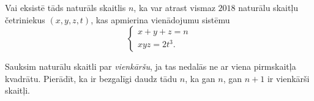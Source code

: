 \documentclass[11pt]{article}
\begin{document}
\begin{problem}[BwTst2018.15]
Vai eksistē tāds naturāls skaitlis $n$, ka var atrast vismaz $2018$ naturālu skaitļu četriniekus $(x,y,z,t)$, 
kas apmierina vienādojumu sistēmu
\[ \left\{ \begin{array}{l}
x + y + z = n\\
xyz = 2t^3. 
\end{array} \right. \]
\end{problem}

\begin{problem}[BwTst2018.16]
Sauksim naturālu skaitli par {\em vienkāršu}, ja tas nedalās ne ar viena pirmskaitļa kvadrātu. 
Pierādīt, ka ir bezgalīgi daudz tādu $n$, ka gan $n$, gan $n+1$ ir vienkārši skaitļi.
\end{problem}
\end{document}
